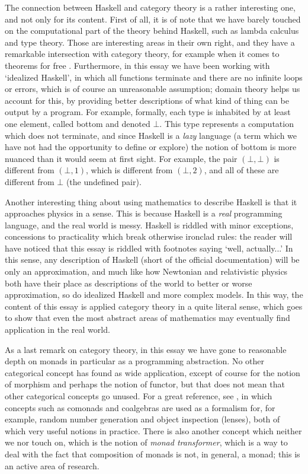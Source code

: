 \documentclass[11pt]{article}
\theoremstyle{nonumberplain}
\begin{document}
The connection between Haskell and category theory is a rather interesting one, and not only for its content. First of all, it is of note that we have barely touched on the computational part of the theory behind Haskell, such as lambda calculus and type theory. Those are interesting areas in their own right, and they have a remarkable intersection with category theory, for example when it comes to theorems for free \cite{theoremsforfree}. Furthermore, in this essay we have been working with `idealized Haskell', in which all functions terminate and there are no infinite loops or errors, which is of course an unreasonable assumption; domain theory helps us account for this, by providing better descriptions of what kind of thing can be output by a program. For example, formally, each type is inhabited by at least one element, called bottom and denoted $\bot$. This type represents a computation which does not terminate, and since Haskell is a \emph{lazy} language (a term which we have not had the opportunity to define or explore) the notion of bottom is more nuanced than it would seem at first sight. For example, the pair $(\bot, \bot)$ is different from $(\bot, 1)$, which is different from $(\bot, 2)$, and all of these are different from $\bot$ (the undefined pair).

Another interesting thing about using mathematics to describe Haskell is that it approaches physics in a sense. This is because Haskell is a \emph{real} programming language, and the real world is messy. Haskell is riddled with minor exceptions, concessions to practicality which break otherwise ironclad rules: the reader will have noticed that this essay is riddled with footnotes saying `well, actually...' In this sense, any description of Haskell (short of the official documentation) will be only an approximation, and much like how Newtonian and relativistic physics both have their place as descriptions of the world to better or worse approximation, so do idealized Haskell and more complex models. In this way, the content of this essay is applied category theory in a quite literal sense, which goes to show that even the most abstract areas of mathematics may eventually find application in the real world.

As a last remark on category theory, in this essay we have gone to reasonable depth on monads in particular as a programming abstraction. No other categorical concept has found as wide application, except of course for the notion of morphism and perhaps the notion of functor, but that does not mean that other categorical concepts go unused. For a great reference, see \cite{catforprog}, in which concepts such as comonads and coalgebras are used as a formalism for, for example, random number generation and object inspection (lenses), both of which very useful notions in practice. There is also another concept which neither we nor \cite{catforprog} touch on, which is the notion of \emph{monad transformer}, which is a way to deal with the fact that composition of monads is not, in general, a monad; this is an active area of research.



\end{document}
